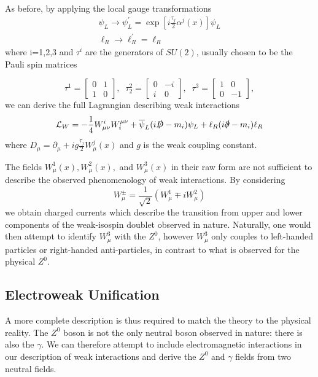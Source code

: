 \documentclass[10pt,a4paper]{book}
\begin{document}
As before, by applying the local gauge transformations
\begin{gather}
\label{weak gauge transformations}
\psi_L \rightarrow \psi_L^\prime = \exp\left[i \frac{\tau_j}{2}\alpha^j (x) \right]\psi_L \\
\ell_R \rightarrow \ell_R^\prime = \ell_R
\end{gather}
where i=1,2,3 and $\tau^i$ are the generators of $SU(2)$, usually chosen to be the Pauli spin matrices

\begin{equation}
\tau^1 = \begin{bmatrix}
0 & 1  \\
1 & 0
\end{bmatrix}, \; \;
\tau^2_2 = \begin{bmatrix}
0 & -i  \\
i & 0
\end{bmatrix}, \; \;
\tau^3 = \begin{bmatrix}
1 & 0 \\
0 & -1
\end{bmatrix},
\end{equation}
we can derive the full Lagrangian describing weak interactions
\begin{equation}
\mathcal{L}_W = -\frac{1}{4}W^i_{\mu\nu}W^{\mu\nu}_i + \overline{\psi}_L(i\slashed{D} - m_i)\psi_{L} +  \ell_{R}(i\slashed{\partial} -m_i)\ell_{R}
\end{equation}
where $D_\mu = \partial_\mu +ig \frac{\tau_j}{2}W^j_\mu(x)$ and $g$ is the weak coupling constant.

The fields $W^1_\mu(x), W^2_\mu(x),$ and $W^3_\mu(x)$ in their raw form are not sufficient to describe the observed phenomenology of weak interactions. By considering 
\begin{equation}
\label{W pm}
W^\pm_\mu = \frac{1}{\sqrt{2}}\left(W_\mu^1 \mp i W^2_\mu \right)
\end{equation}
we obtain charged currents which describe the transition from upper and lower components of the weak-isospin doublet observed in nature. Naturally, one would then attempt to identify $W^3_\mu$ with the $Z^0$, however $W^3_\mu$ only couples to left-handed particles or right-handed anti-particles, in contrast to what is observed for the physical $Z^0$. 

\subsection{Electroweak Unification}
A more complete description is thus required to match the theory to the physical reality. The $Z^0$ boson is not the only neutral boson observed in nature: there is also the $\gamma$. We can therefore attempt to include electromagnetic interactions in our description of weak interactions and derive the $Z^0$ and $\gamma$ fields from two neutral fields.
\end{document}
